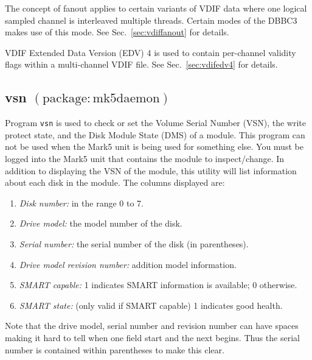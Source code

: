 The concept of fanout applies to certain variants of VDIF data where one logical sampled channel is interleaved multiple threads.
Certain modes of the DBBC3 makes use of this mode.
See Sec.~\ref{sec:vdiffanout} for details.

VDIF Extended Data Version (EDV) 4 is used to contain per-channel validity flags within a multi-channel VDIF file.
See Sec.~\ref{sec:vdifedv4} for details.






\subsection{vsn {\small $\mathrm{(package: mk5daemon)}$}} \label{sec:vsntool}

Program {\tt vsn} is used to check or set the Volume Serial Number (VSN), the write protect state, and the Disk Module State (DMS) of a module.
This program can not be used when the Mark5 unit is being used for something else.
You must be logged into the Mark5 unit that contains the module to inspect/change.
In addition to displaying the VSN of the module, this utility will list information about each disk in the module.
The columns displayed are:

\begin{enumerate}
\item {\em Disk number:} in the range 0 to 7.
\item {\em Drive model:} the model number of the disk.
\item {\em Serial number:} the serial number of the disk (in parentheses).
\item {\em Drive model revision number:} addition model information.
\item {\em SMART capable:} 1 indicates SMART information is available; 0 otherwise.
\item {\em SMART state:} (only valid if SMART capable) 1 indicates good health.
\end{enumerate}

Note that the drive model, serial number and revision number can have spaces making it hard to tell when one field start and the next begins.
Thus the serial number is contained within parentheses to make this clear.

